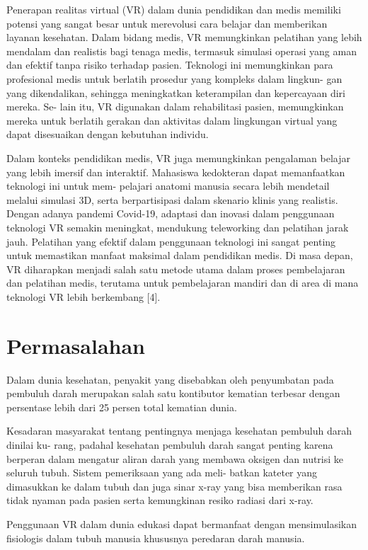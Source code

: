 Penerapan realitas virtual (VR) dalam dunia pendidikan dan medis memiliki potensi yang sangat besar untuk merevolusi cara belajar dan memberikan layanan kesehatan. Dalam bidang medis, VR memungkinkan pelatihan yang lebih mendalam dan realistis bagi tenaga medis, termasuk simulasi operasi yang aman dan efektif tanpa risiko terhadap pasien. Teknologi ini memungkinkan para profesional medis untuk berlatih prosedur yang kompleks dalam lingkun- gan yang dikendalikan, sehingga meningkatkan keterampilan dan kepercayaan diri mereka. Se- lain itu, VR digunakan dalam rehabilitasi pasien, memungkinkan mereka untuk berlatih gerakan dan aktivitas dalam lingkungan virtual yang dapat disesuaikan dengan kebutuhan individu.

Dalam konteks pendidikan medis, VR juga memungkinkan pengalaman belajar yang lebih imersif dan interaktif. Mahasiswa kedokteran dapat memanfaatkan teknologi ini untuk mem- pelajari anatomi manusia secara lebih mendetail melalui simulasi 3D, serta berpartisipasi dalam skenario klinis yang realistis. Dengan adanya pandemi Covid-19, adaptasi dan inovasi dalam penggunaan teknologi VR semakin meningkat, mendukung teleworking dan pelatihan jarak jauh. Pelatihan yang efektif dalam penggunaan teknologi ini sangat penting untuk memastikan manfaat maksimal dalam pendidikan medis. Di masa depan, VR diharapkan menjadi salah satu metode utama dalam proses pembelajaran dan pelatihan medis, terutama untuk pembelajaran mandiri dan di area di mana teknologi VR lebih berkembang [4].


\lipsum[2]

\section{Permasalahan}
\label{sec:permasalahan}

Dalam dunia kesehatan, penyakit yang disebabkan oleh penyumbatan pada pembuluh darah merupakan salah satu kontibutor kematian terbesar dengan persentase lebih dari 25 persen total kematian dunia.

Kesadaran masyarakat tentang pentingnya menjaga kesehatan pembuluh darah dinilai ku- rang, padahal kesehatan pembuluh darah sangat penting karena berperan dalam mengatur aliran darah yang membawa oksigen dan nutrisi ke seluruh tubuh. Sistem pemeriksaan yang ada meli- batkan kateter yang dimasukkan ke dalam tubuh dan juga sinar x-ray yang bisa memberikan rasa tidak nyaman pada pasien serta kemungkinan resiko radiasi dari x-ray.

Penggunaan VR dalam dunia edukasi dapat bermanfaat dengan mensimulasikan fisiologis dalam tubuh manusia khususnya peredaran darah manusia.


